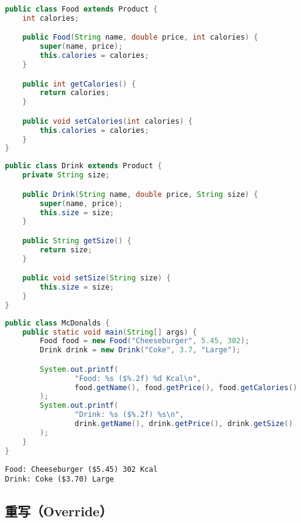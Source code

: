 \begin{lstlisting}[language=Java]
public class Food extends Product {
    int calories;

    public Food(String name, double price, int calories) {
        super(name, price);
        this.calories = calories;
    }

    public int getCalories() {
        return calories;
    }

    public void setCalories(int calories) {
        this.calories = calories;
    }
}
\end{lstlisting}

\begin{lstlisting}[language=Java]
public class Drink extends Product {
    private String size;

    public Drink(String name, double price, String size) {
        super(name, price);
        this.size = size;
    }

    public String getSize() {
        return size;
    }

    public void setSize(String size) {
        this.size = size;
    }
}
\end{lstlisting}

\begin{lstlisting}[language=Java]
public class McDonalds {
    public static void main(String[] args) {
        Food food = new Food("Cheeseburger", 5.45, 302);
        Drink drink = new Drink("Coke", 3.7, "Large");

        System.out.printf(
                "Food: %s ($%.2f) %d Kcal\n",
                food.getName(), food.getPrice(), food.getCalories()
        );
        System.out.printf(
                "Drink: %s ($%.2f) %s\n",
                drink.getName(), drink.getPrice(), drink.getSize()
        );
    }
}
\end{lstlisting}

\begin{tcolorbox}
    \begin{verbatim}
Food: Cheeseburger ($5.45) 302 Kcal
Drink: Coke ($3.70) Large
	\end{verbatim}
\end{tcolorbox}

\vspace{0.5cm}

\subsection{重写（Override）}

